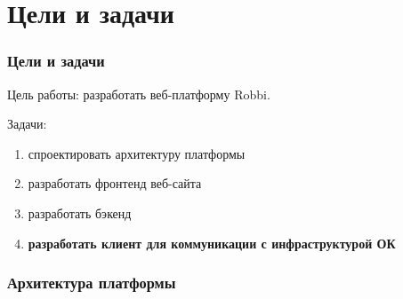 \section{Цели и задачи}
\begin{frame}
\frametitle{Цели и задачи}
Цель работы: разработать веб-платформу Robbi.

Задачи:
\begin{enumerate}
    \item спроектировать архитектуру платформы
    \item разработать фронтенд веб-сайта
    \item разработать бэкенд
    \item \textbf{разработать клиент для коммуникации с инфраструктурой ОК}
\end{enumerate}
\end{frame}

\begin{frame}
\frametitle{Архитектура платформы}
\end{frame}
